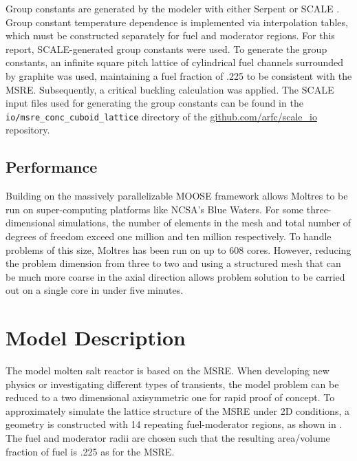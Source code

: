 \documentclass{article}
\let\Oldsection\section
\renewcommand{\section}{\FloatBarrier\Oldsection}
\let\Oldsubsection\subsection
\renewcommand{\subsection}{\FloatBarrier\Oldsubsection}
\newcommand{\code}[1]{\texttt{#1}}
\begin{document}
Group constants are generated by the modeler with either Serpent
\cite{leppanen_serpent_2015} or SCALE \cite{dehart_reactor_2011}. Group constant
temperature dependence is implemented via interpolation tables, which must be
constructed separately for fuel and moderator regions. For this report,
SCALE-generated group constants were used. To generate the group constants, an
infinite square pitch lattice of cylindrical fuel channels surrounded by
graphite was used, maintaining a fuel fraction of .225 to be consistent with the
\gls{MSRE}. Subsequently, a critical buckling calculation was applied. The SCALE
input files used for generating the group constants can be found in the
\code{io/msre\_conc\_cuboid\_lattice} directory of the
\url{github.com/arfc/scale_io} repository.

\subsection{Performance}

Building on the massively parallelizable \gls{MOOSE} framework allows Moltres
to be run on super-computing platforms like \gls{NCSA}'s Blue Waters. For some
three-dimensional simulations, the number of
elements in the mesh and total number of degrees of freedom exceed one million
and ten million respectively. To handle problems of this size, Moltres has been
run on up to 608 cores. However, reducing the problem dimension from three to
two and using a structured mesh that can be much more coarse in the axial
direction allows problem solution to be carried out on a single core in under
five minutes.

\section{Model Description}

The model molten salt
reactor is based on the \gls{MSRE}. When developing new physics or investigating
different types of transients, the model problem can be reduced to a two
dimensional axisymmetric one for rapid proof of concept. To approximately simulate the lattice
structure of the \gls{MSRE} under 2D conditions, a geometry is constructed with 14 repeating
fuel-moderator regions, as shown in . The fuel and moderator
radii are chosen such that the resulting area/volume fraction of fuel is .225 as
for the \gls{MSRE}.
\end{document}
